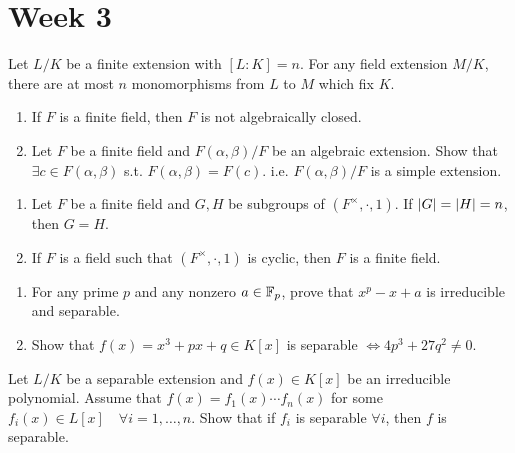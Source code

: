 
\section{Week 3}

\begin{exercise}
  Let $L/K$ be a finite extension with $[L:K] = n$. For any field extension
  $M/K$, there are at most $n$ monomorphisms from $L$ to $M$ which fix $K$.
\end{exercise}

\begin{exercise} \mbox{}
  \begin{enumerate}
    \item If $F$ is a finite field, then $F$ is not algebraically closed.
    \item Let $F$ be a finite field and $F(\alpha,\beta) / F$ be an
      algebraic extension. Show that $\exists c \in F(\alpha,\beta)$ s.t.
      $F(\alpha,\beta) = F(c)$. i.e. $F(\alpha,\beta)/F$ is a simple extension.
  \end{enumerate}
\end{exercise}

\begin{exercise} \mbox{}
  \begin{enumerate}
    \item Let $F$ be a finite field and $G,H$ be subgroups of
      $(F^\times, \cdot, 1)$. If $\lvert G\rvert = \lvert H\rvert = n$, then $G = H$.
    \item If $F$ is a field such that $(F^\times, \cdot, 1)$ is cyclic,
      then $F$ is a finite field.
  \end{enumerate}
\end{exercise}

\begin{exercise} \mbox{}
  \begin{enumerate}
    \item For any prime $p$ and any nonzero $a \in \mathbb{F}_p$, prove that
      $x^p - x + a$ is irreducible and separable.
    \item Show that $f(x) = x^3 + px + q \in K[x]$ is separable
      $\iff 4p^3 + 27q^2 \ne 0$.
  \end{enumerate}
\end{exercise}

\begin{exercise}
  Let $L/K$ be a separable extension and $f(x) \in K[x]$ be an irreducible
  polynomial. Assume that $f(x) = f_1(x) \cdots f_n(x)$ for some
  $f_i(x) \in L[x] \quad \forall i = 1, \dots, n$. Show that if
  $f_i$ is separable $\forall i$, then $f$ is separable.
\end{exercise}


